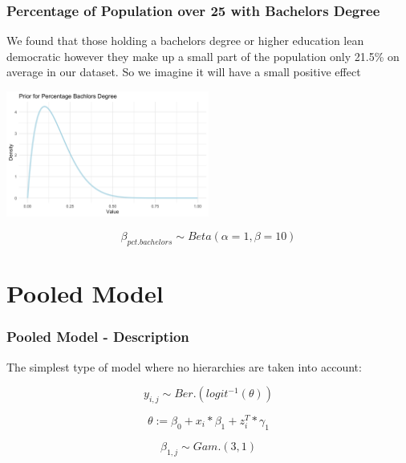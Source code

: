 \documentclass{beamer}
\begin{document}
\begin{frame}
  \frametitle{Percentage of Population over 25 with Bachelors Degree}
  We found that those holding a bachelors degree or higher education lean democratic however they make up a small part of the population only 21.5\% on average in our dataset. So we imagine it will have a small positive effect
  \begin{center}
    \includegraphics[width=0.5\textwidth]{plots/prior_pct.bachelors.png}
  \end{center}
  

  $$  \beta_{pct.bachelors} \sim Beta( \alpha = 1 , \beta = 10 )$$
\end{frame}



\section{Pooled Model}

\begin{frame}
\frametitle{Pooled Model - Description}

The simplest type of model where no hierarchies are taken into account:

\[y_{i, j} \sim Ber.(logit^{-1}(\theta))\]

\[\theta := \beta_0 + x_{i} * \beta_{1}  + z_{i}^T * \gamma_{1}\]

\[\beta_{1,j} \sim Gam.(3, 1)\]

\end{frame}
\end{document}
